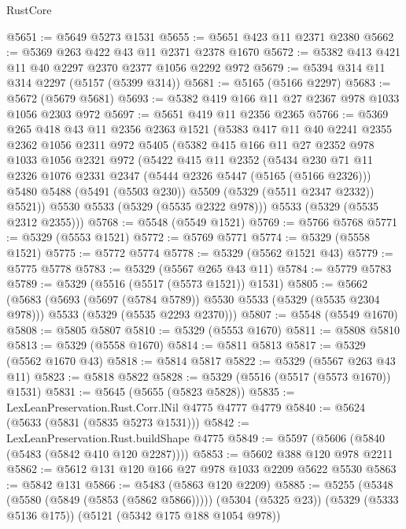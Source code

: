 \begin{lexlean}{RustCore}
\begin{coremodule}
@5651 := @5649 @5273 @1531
@5655 := @5651 @423 @11 @2371 @2380
@5662 := @5369 @263 @422 @43 @11 @2371 @2378 @1670
@5672 := @5382 @413 @421 @11 @40 @2297 @2370 @2377 @1056 @2292 @972
@5679 := @5394 @314 @11 @314 @2297 (@5157 (@5399 @314))
@5681 := @5165 (@5166 @2297)
@5683 := @5672 (@5679 @5681)
@5693 := @5382 @419 @166 @11 @27 @2367 @978 @1033 @1056 @2303 @972
@5697 := @5651 @419 @11 @2356 @2365
@5766 := @5369
    @265
    @418
    @43
    @11
    @2356
    @2363
    @1521
    (@5383
      @417
      @11
      @40
      @2241
      @2355
      @2362
      @1056
      @2311
      @972
      @5405
      (@5382
        @415
        @166
        @11
        @27
        @2352
        @978
        @1033
        @1056
        @2321
        @972
        (@5422
          @415
          @11
          @2352
          (@5434
            @230
            @71
            @11
            @2326
            @1076
            @2331
            @2347
            (@5444 @2326 @5447 (@5165 (@5166 @2326)))
            @5480
            @5488
            (@5491 (@5503 @230))
            @5509
            (@5329 (@5511 @2347 @2332))
            @5521))
        @5530
        @5533
        (@5329 (@5535 @2322 @978)))
      @5533
      (@5329 (@5535 @2312 @2355)))
@5768 := @5548 (@5549 @1521)
@5769 := @5766 @5768
@5771 := @5329 (@5553 @1521)
@5772 := @5769 @5771
@5774 := @5329 (@5558 @1521)
@5775 := @5772 @5774
@5778 := @5329 (@5562 @1521 @43)
@5779 := @5775 @5778
@5783 := @5329 (@5567 @265 @43 @11)
@5784 := @5779 @5783
@5789 := @5329 (@5516 (@5517 (@5573 @1521)) @1531)
@5805 := @5662
    (@5683
      (@5693 (@5697 (@5784 @5789)) @5530 @5533 (@5329 (@5535 @2304 @978)))
      @5533
      (@5329 (@5535 @2293 @2370)))
@5807 := @5548 (@5549 @1670)
@5808 := @5805 @5807
@5810 := @5329 (@5553 @1670)
@5811 := @5808 @5810
@5813 := @5329 (@5558 @1670)
@5814 := @5811 @5813
@5817 := @5329 (@5562 @1670 @43)
@5818 := @5814 @5817
@5822 := @5329 (@5567 @263 @43 @11)
@5823 := @5818 @5822
@5828 := @5329 (@5516 (@5517 (@5573 @1670)) @1531)
@5831 := @5645 (@5655 (@5823 @5828))
@5835 := LexLeanPreservation.Rust.Corr.lNil @4775 @4777 @4779
@5840 := @5624 (@5633 (@5831 (@5835 @5273 @1531)))
@5842 := LexLeanPreservation.Rust.buildShape @4775
@5849 := @5597 (@5606 (@5840 (@5483 (@5842 @410 @120 @2287))))
@5853 := @5602 @388 @120 @978 @2211
@5862 := @5612 @131 @120 @166 @27 @978 @1033 @2209 @5622 @5530
@5863 := @5842 @131
@5866 := @5483 (@5863 @120 @2209)
@5885 := @5255
    (@5348 (@5580 (@5849 (@5853 (@5862 @5866)))))
    (@5304 (@5325 @23))
    (@5329 (@5333 @5136 @175))
    (@5121 (@5342 @175 @188 @1054 @978))

\end{coremodule}
\end{lexlean}
